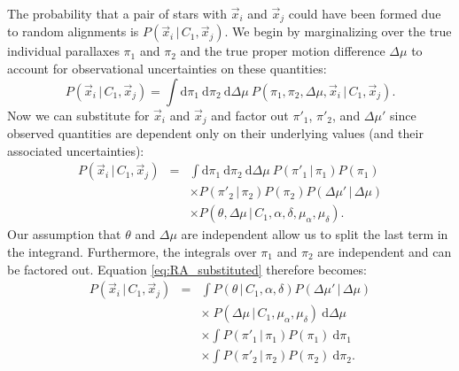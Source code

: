 \documentclass[usenatbib]{mnras}
\newcommand{\given}{\,|\,}
\newcommand{\dd}{\mathrm{d}}
\begin{document}
The probability that a pair of stars with $\vec{x}_i$ and $\vec{x}_j$ could have been formed due to random alignments is $P(\vec{x}_i \given C_1, \vec{x}_j)$. We begin by marginalizing over the true individual parallaxes $\pi_1$ and $\pi_2$ and the true proper motion difference $\Delta \mu$ to account for observational uncertainties on these quantities:
\begin{equation}
P(\vec{x}_i \given C_1, \vec{x}_j) = \int \dd \pi_1\ \dd \pi_2\ \dd \Delta \mu\ P(\pi_1, \pi_2, \Delta \mu, \vec{x}_i \given C_1, \vec{x}_j). \label{eq:P_noise_marginalized}
\end{equation}
Now we can substitute for $\vec{x}_i$ and $\vec{x}_j$ and factor out $\pi'_1$, $\pi'_2$, and $\Delta \mu'$ since observed quantities are dependent only on their underlying values (and their associated uncertainties):
\begin{eqnarray}
P(\vec{x}_i \given C_1, \vec{x}_j) &=& \int  \dd \pi_1\ \dd \pi_2\ \dd \Delta \mu\ P(\pi'_1 \given \pi_1) P(\pi_1) \nonumber \\
	& &  \times P(\pi'_2 \given \pi_2) P(\pi_2) P(\Delta \mu' \given \Delta \mu) \nonumber \\
	& &  \times  P(\theta, \Delta \mu \given C_1, \alpha, \delta, \mu_{\alpha}, \mu_{\delta}). \label{eq:RA_substituted}
\end{eqnarray}
Our assumption that $\theta$ and $\Delta \mu$ are independent allow us to split the last term in the integrand. 
Furthermore, the integrals over $\pi_1$ and $\pi_2$ are independent and can be factored out. Equation \ref{eq:RA_substituted} therefore becomes:
\begin{eqnarray}
P(\vec{x}_i \given C_1, \vec{x}_j) &=& \int P(\theta \given C_1, \alpha, \delta) P(\Delta \mu' \given \Delta \mu) \nonumber \\
	& & \times\ P(\Delta \mu \given C_1, \mu_{\alpha}, \mu_{\delta})\ \dd \Delta \mu \nonumber \\
	& &  \times \int  P(\pi'_1 \given \pi_1) P(\pi_1)\ \dd \pi_1 \nonumber \\
	& &  \times \int  P(\pi'_2 \given \pi_2) P(\pi_2)\ \dd \pi_2. \label{eq:RA_factored}
\end{eqnarray}
\end{document}
